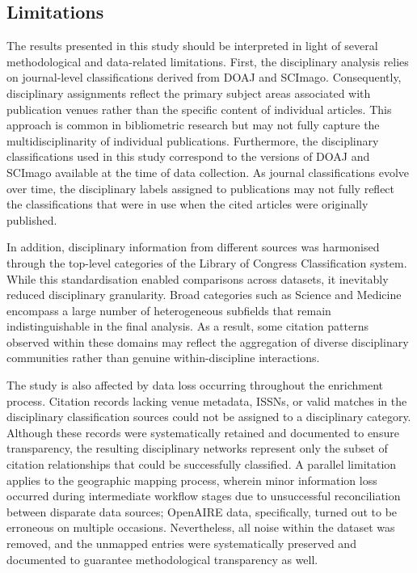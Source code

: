 \documentclass[year=2026]{cup-journal}
\begin{document}
\subsection{Limitations}

The results presented in this study should be interpreted in light of several methodological and data-related limitations. First, the disciplinary analysis relies on journal-level classifications derived from DOAJ and SCImago. Consequently, disciplinary assignments reflect the primary subject areas associated with publication venues rather than the specific content of individual articles. This approach is common in bibliometric research but may not fully capture the multidisciplinarity of individual publications. Furthermore, the disciplinary classifications used in this study correspond to the versions of DOAJ and SCImago available at the time of data collection. As journal classifications evolve over time, the disciplinary labels assigned to publications may not fully reflect the classifications that were in use when the cited articles were originally published.

In addition, disciplinary information from different sources was harmonised through the top-level categories of the Library of Congress Classification system. While this standardisation enabled comparisons across datasets, it inevitably reduced disciplinary granularity. Broad categories such as Science and Medicine encompass a large number of heterogeneous subfields that remain indistinguishable in the final analysis. As a result, some citation patterns observed within these domains may reflect the aggregation of diverse disciplinary communities rather than genuine within-discipline interactions.

The study is also affected by data loss occurring throughout the enrichment process. Citation records lacking venue metadata, ISSNs, or valid matches in the disciplinary classification sources could not be assigned to a disciplinary category. Although these records were systematically retained and documented to ensure transparency, the resulting disciplinary networks represent only the subset of citation relationships that could be successfully classified. A parallel limitation applies to the geographic mapping process, wherein minor information loss occurred during intermediate workflow stages due to unsuccessful reconciliation between disparate data sources; OpenAIRE data, specifically, turned out to be erroneous on multiple occasions. Nevertheless, all noise within the dataset was removed, and the unmapped entries were systematically preserved and documented to guarantee methodological transparency as well.
\end{document}
